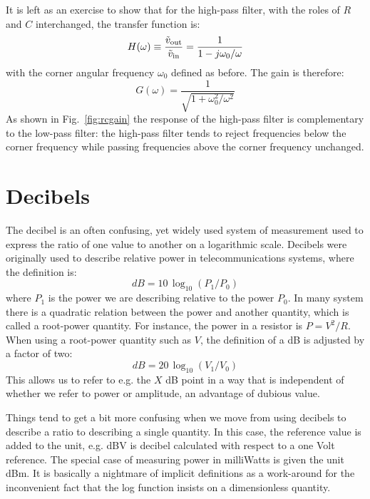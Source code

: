 \documentclass[12pt,oneside]{book}
\begin{document}
It is left as an exercise to show that for the high-pass filter, with the roles of $R$ and $C$ interchanged, the transfer function is:
\begin{equation*}
H(\omega) \equiv \frac{\tilde{v}_{\rm out}}{\tilde{v}_{\rm in}} = \frac{1}{1 - j \omega_0/\omega}\\
\end{equation*}
with the corner angular frequency $\omega_0$ defined as before.  The gain is therefore:
\begin{equation*}
G(\omega) = \frac{1}{\sqrt{1+\omega_0^2/\omega^2}}
\end{equation*}
As shown in Fig.~\ref{fig:rcgain} the response of the high-pass filter is complementary to the low-pass filter:  the high-pass filter tends to reject frequencies below the corner frequency while passing frequencies above the corner frequency unchanged.

\section{Decibels}

The decibel is an often confusing, yet widely used system of measurement used to express the ratio of one value to another on a logarithmic scale.  Decibels were originally used to describe relative power in telecommunications systems, where the definition is:
\begin{equation}
dB = 10 \, \log_{10}(P_1 / P_0)
\end{equation}
where $P_1$ is the power we are describing relative to the power $P_0$.  In many system there is a quadratic relation between the power and another quantity, which is called a root-power quantity.
For instance, the power in a resistor is $P=V^2/R$.  When using a root-power quantity such as $V$, the definition of a dB is adjusted by a factor of two:
\begin{equation}
dB = 20 \, \log_{10}(V_1 / V_0)
\end{equation}
This allows us to refer to e.g. the $X$ dB point in a way that is independent of whether we refer to power or amplitude, an advantage of dubious value.

Things tend to get a bit more confusing when we move from using decibels to describe a ratio to describing a single quantity.  In this case, the reference value is added to the unit, e.g. dBV is decibel calculated with respect to a one Volt reference.   The special case of measuring power in milliWatts is given the unit dBm.  It is basically a nightmare of implicit definitions as a work-around for the inconvenient fact that the log function insists on a dimensionless quantity.
\end{document}
